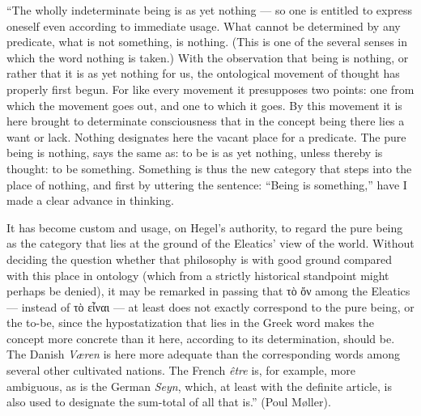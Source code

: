 \documentclass[12pt]{book}
\begin{document}
``The wholly indeterminate being is as yet nothing --- so one is entitled to
express oneself even according to immediate usage. What cannot be determined
by any predicate, what is not something, is nothing. (This is one of the
several senses in which the word nothing is taken.) With the observation
that being is nothing, or rather that it is as yet nothing for us, the
ontological movement of thought has properly first begun. For like every
movement it presupposes two points: one from which the movement goes out,
and one to which it goes. By this movement it is here brought to determinate
consciousness that in the concept being there lies a want or lack. Nothing
designates here the vacant place for a predicate. The pure being is nothing,
says the same as: to be is as yet nothing, unless thereby is thought: to be
something. Something is thus the new category that steps into the place of
nothing, and first by uttering the sentence: ``Being is something,'' have I
made a clear advance in thinking.

It has become custom and usage, on Hegel's authority, to regard the pure
being as the category that lies at the ground of the Eleatics' view of the
world. Without deciding the question whether that philosophy is with good
ground compared with this place in ontology (which from a strictly
historical standpoint might perhaps be denied), it may be remarked in
passing that τὸ ὄν among the Eleatics --- instead of τὸ εἶναι --- at least
does not exactly correspond to the pure being, or the to-be, since the
hypostatization that lies in the Greek word makes the concept more concrete
than it here, according to its determination, should be. The Danish
\emph{Væren} is here more adequate than the corresponding words among
several other cultivated nations. The French \textit{être} is, for example,
more ambiguous, as is the German \emph{Seyn}, which, at least with the
definite article, is also used to designate the sum-total of all that is.''
(Poul Møller).
\end{document}
